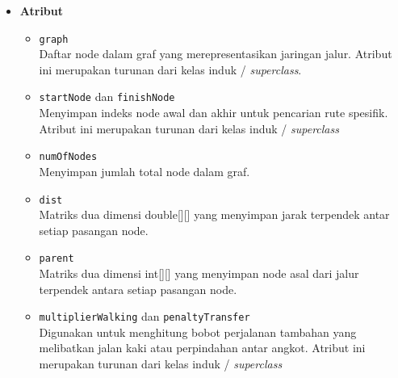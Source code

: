 \begin{itemize}
    \item \textbf{Atribut}
    \begin{itemize}
        \item \texttt{graph}
        \\ Daftar node dalam graf yang merepresentasikan jaringan jalur. Atribut ini merupakan turunan dari kelas induk / \textit{superclass}.
        \item \texttt{startNode} dan \texttt{finishNode}
        \\ Menyimpan indeks node awal dan akhir untuk pencarian rute spesifik. Atribut ini merupakan turunan dari kelas induk / \textit{superclass}
        \item \texttt{numOfNodes}
        \\ Menyimpan jumlah total node dalam graf.
        \item \texttt{dist}
        \\ Matriks dua dimensi double[][] yang menyimpan jarak terpendek antar setiap pasangan node.
        \item \texttt{parent}
        \\ Matriks dua dimensi int[][] yang menyimpan node asal dari jalur terpendek antara setiap pasangan node.
        \item \texttt{multiplierWalking} dan \texttt{penaltyTransfer}
        \\ Digunakan untuk menghitung bobot perjalanan tambahan yang melibatkan jalan kaki atau perpindahan antar angkot.  Atribut ini merupakan turunan dari kelas induk / \textit{superclass}
    \end{itemize}


\end{itemize}
